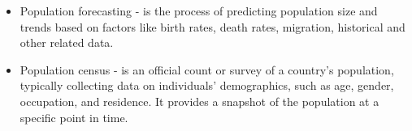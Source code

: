 \begin{itemize}
    \item Population forecasting - is the process of predicting population size and trends based on factors like birth rates, death rates, migration, historical and other related data.
    \item Population census - is an official count or survey of a country's population, typically collecting data on individuals' demographics, such as age, gender, occupation, and residence. It provides a snapshot of the population at a specific point in time.
\end{itemize}
